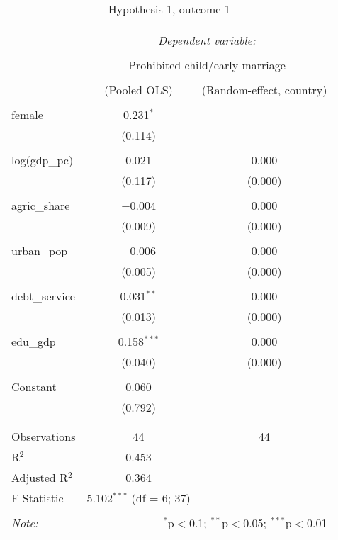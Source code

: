 \documentclass[12pt]{article}
\begin{document}
\begin{table}[!htbp] 
\centering 
  \caption{Hypothesis 1, outcome 1} 
  \label{} 
\begin{tabular}{@{\extracolsep{5pt}}lcc} 
\\[-1.8ex]\hline 
\hline \\[-1.8ex] 
 & \multicolumn{2}{c}{\textit{Dependent variable:}} \\ 
\cline{2-3} 
\\[-1.8ex] & \multicolumn{2}{c}{Prohibited child/early marriage} \\ 
\\[-1.8ex] & (Pooled OLS) & (Random-effect, country)\\ 
\hline \\[-1.8ex] 
 female & 0.231$^{*}$ &  \\ 
  & (0.114) &  \\ 
  & & \\ 
 log(gdp\_pc) & 0.021 & 0.000 \\ 
  & (0.117) & (0.000) \\ 
  & & \\ 
 agric\_share & $-$0.004 & 0.000 \\ 
  & (0.009) & (0.000) \\ 
  & & \\ 
 urban\_pop & $-$0.006 & 0.000 \\ 
  & (0.005) & (0.000) \\ 
  & & \\ 
 debt\_service & 0.031$^{**}$ & 0.000 \\ 
  & (0.013) & (0.000) \\ 
  & & \\ 
 edu\_gdp & 0.158$^{***}$ & 0.000 \\ 
  & (0.040) & (0.000) \\ 
  & & \\ 
 Constant & 0.060 &  \\ 
  & (0.792) &  \\ 
  & & \\ 
\hline \\[-1.8ex] 
Observations & 44 & 44 \\ 
R$^{2}$ & 0.453 &  \\ 
Adjusted R$^{2}$ & 0.364 &  \\ 
F Statistic & 5.102$^{***}$ (df = 6; 37) &  \\ 
\hline 
\hline \\[-1.8ex] 
\textit{Note:}  & \multicolumn{2}{r}{$^{*}$p$<$0.1; $^{**}$p$<$0.05; $^{***}$p$<$0.01} \\ 
\end{tabular} 
\end{table} 
\end{document}
